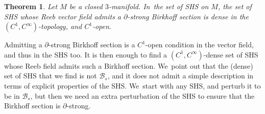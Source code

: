 \documentclass[11pt]{article}
\newcommand{\threemanifold}{$3$\nobreakdash-mani\-fold\xspace}
\newtheorem{theorem}{Theorem}[section]
\theoremstyle{definition}
\begin{document}
\begin{theorem}\label{thm:C1generic}
Let $M$ be a closed \threemanifold. In~the set of SHS on $M$, the set of SHS whose Reeb vector field admits a $\partial$-strong Birkhoff section is dense in the $(C^1,C^\infty)$-topology, and $C^1$-open.
\end{theorem}

Admitting a $\partial$-strong Birkhoff section is a $C^1$-open condition in the vector field, and thus in the SHS too. It is then enough to find a $(C^1,C^\infty)$-dense set of SHS whose Reeb field admits such a Birkhoff section. We~point out that the (dense) set of SHS that we find is not $\mathcal{B}_s$, and it does not admit a simple description in terms of explicit properties of the SHS. We~start with any SHS, and perturb it to be in $\mathcal{B}_s$, but then we need an extra perturbation of the SHS to ensure that the Birkhoff section is $\partial$-strong.
\end{document}
